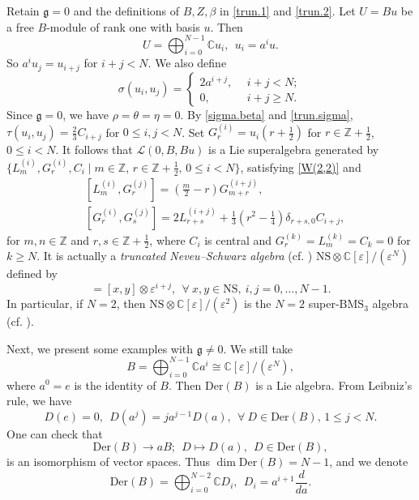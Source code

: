 \documentclass[12pt]{article}
\numberwithin{equation}{section}
\theoremstyle{definition}
\theoremstyle{plain}
\newcommand{\bC}{\ensuremath{\mathbb{C}}}
\newcommand{\bZ}{\ensuremath{\mathbb{Z}}}
\newcommand{\fg}{\mathfrak{g}}
\newcommand{\Der}{\mathrm{Der }}
\newcommand{\cL}{\ensuremath{\mathcal{L}}}
\begin{document}
Retain $\fg=0$ and the definitions of $B,Z,\beta$ in \eqref{trun.1} and \eqref{trun.2}. Let $U=Bu$ be a free $B$-module of rank one with basis $u$. Then 
\begin{equation}
    U=\bigoplus_{i=0}^{N-1}\bC u_i,\ \ u_i=a^iu.
\end{equation}
So $a^iu_j=u_{i+j}$ for $i+j<N$. We also define 
\begin{equation}\label{trun.sigma}
    \sigma(u_i,u_j)=\begin{cases}
        2a^{i+j},\ \ &i+j<N;\\
        0,\ \ &i+j\ge N.
    \end{cases}
\end{equation}
Since $\fg=0$, we have $\rho=\theta=\eta=0$. By \eqref{sigma.beta} and \eqref{trun.sigma}, $\tau(u_i,u_j)=\frac{2}{3}C_{i+j}$ for $0\le i,j<N$. Set $G_r^{(i)}=u_i(r+\frac{1}{2})$ for $r\in\bZ+\frac{1}{2}$, $0\le i<N$. It follows that $\cL(0,B,Bu)$ is a Lie superalgebra generated by $\{L_m^{(i)}, G_r^{(i)}, C_i\mid m\in\bZ,\,r\in\bZ+\frac{1}{2},\,0\le i<N\}$, satisfying \eqref{W(2,2)} and
\begin{align*}
    &[L_m^{(i)},G_r^{(j)}]=\left(\frac m2-r\right)G_{m+r}^{(i+j)},\\
    &[G_r^{(i)},G_s^{(j)}]=2L_{r+s}^{(i+j)}+\frac13\left(r^2-\frac14\right)\delta_{r+s,0}C_{i+j},
\end{align*}
for $m,n\in\bZ$ and $r,s\in\bZ+\frac{1}{2}$, where $C_i$ is central and $G_r^{(k)}=L_m^{(k)}=C_k=0$ for $k\ge N$. It is actually a \emph{truncated Neveu--Schwarz algebra} (cf. \cite{WLP}) $\mathrm{NS}\otimes\bC[\varepsilon]/(\varepsilon^N)$ defined by  
\begin{equation*}
    [x\otimes \varepsilon^i,y\otimes \varepsilon^j]=[x,y]\otimes \varepsilon^{i+j},\ \ \forall\ x,y\in\mathrm{NS},\ i,j=0,\dots,N-1.
\end{equation*}
In particular, if $N=2$, then $\mathrm{NS}\otimes\bC[\varepsilon]/(\varepsilon^2)$ is the $N=2$ super-$\mathrm{BMS}_3$ algebra (cf. \cite{GPB,Man}). 

Next, we present some examples with $\fg\neq0$. We still take 
\begin{equation*}
    B=\bigoplus_{i=0}^{N-1}\bC a^i\cong\bC[\varepsilon]/(\varepsilon^N),
\end{equation*}
where $a^0=e$ is the identity of $B$. Then $\Der(B)$ is a Lie algebra. From Leibniz's rule, we have 
\begin{equation*}
    D(e)=0,\ \ D(a^j)=ja^{j-1}  D(a),\ \ \forall\ D\in\Der(B),\,1\le j<N.
\end{equation*}
One can check that
\begin{equation*}
    \Der(B)\longrightarrow a  B;\ \ D\longmapsto D(a),\ \ D\in\Der(B),
\end{equation*}
is an isomorphism of vector spaces. Thus $\dim\Der(B)=N-1$, and we denote 
\begin{equation*}
    \Der(B)=\bigoplus_{i=0}^{N-2}\bC D_i,\ \ D_i=a^{i+1}\frac{d}{da}.
\end{equation*}
\end{document}
